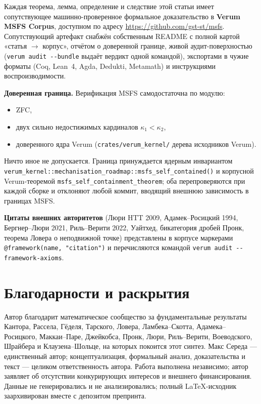 \documentclass[11pt]{article}
\theoremstyle{plain}
\theoremstyle{definition}
\begin{document}
Каждая теорема, лемма, определение и следствие этой статьи имеет сопутствующее машинно-проверенное формальное доказательство в \textbf{Verum MSFS Corpus}, доступном по адресу \url{https://github.com/gst-st/msfs}. Сопутствующий артефакт снабжён собственным README с полной картой «статья $\to$ корпус», отчётом о доверенной границе, живой аудит-поверхностью (\texttt{verum audit -\!-bundle} выдаёт вердикт одной командой), экспортами в чужие форматы (Coq, Lean~4, Agda, Dedukti, Metamath) и инструкциями воспроизводимости.

\medskip

\noindent\textbf{Доверенная граница.} Верификация MSFS самодостаточна по модулю:
\begin{itemize}
\item ZFC,
\item двух сильно недостижимых кардиналов $\kappa_1 < \kappa_2$,
\item доверенного ядра Verum (\texttt{crates/verum\_kernel/} дерева исходников Verum).
\end{itemize}
Ничто иное не допускается. Граница принуждается ядерным инвариантом
\texttt{verum\_kernel::mechanisation\_roadmap::msfs\_self\_contained()}
и корпусной Verum-теоремой
\texttt{msfs\_self\_containment\_theorem}; оба перепроверяются при каждой сборке и отклоняют любой коммит, вводящий внешнюю зависимость в границах MSFS.

\medskip

\noindent\textbf{Цитаты внешних авторитетов} (Люри HTT 2009, Адамек--Росицкий 1994, Бергнер--Люри 2021, Риль--Верити 2022, Уайтхед, бикатегория дробей Пронк, теорема Ловера о неподвижной точке) представлены в корпусе маркерами \texttt{@framework(name, "citation")} и перечисляются командой \texttt{verum audit -\!-framework-axioms}.


\section*{Благодарности и раскрытия}

Автор благодарит математическое сообщество за фундаментальные результаты Кантора, Рассела, Гёделя, Тарского, Ловера, Ламбека--Скотта, Адамека--Росицкого, Маккаи--Паре, Джейкобса, Пронк, Люри, Риль--Верити, Воеводского, Шрайбера и Клаузена--Шольце, на которых покоится этот синтез. Макс Середа — единственный автор; концептуализация, формальный анализ, доказательства и текст — целиком ответственность автора. Работа выполнена независимо; автор заявляет об отсутствии конкурирующих интересов и внешнего финансирования. Данные не генерировались и не анализировались; полный LaTeX-исходник заархивирован вместе с депозитом препринта.
\end{document}
